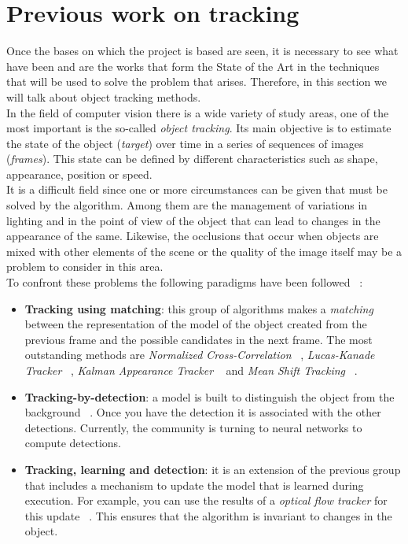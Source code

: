 \documentclass{bmvc2k}
\begin{document}
\section{Previous work on tracking}
Once the bases on which the project is based are seen, it is necessary to see what have been and are the works that form the State of the Art in the techniques that will be used to solve the problem that arises. Therefore, in this section we will talk about object tracking methods.\\ %
In the field of computer vision there is a wide variety of study areas, one of the most important is the so-called \textit{object tracking}. Its main objective is to estimate the state of the object (\textit{target}) over time in a series of sequences of images (\textit{frames}). This state can be defined by different characteristics such as shape, appearance, position or speed.\\
It is a difficult field since one or more circumstances can be given that must be solved by the algorithm. Among them are the management of variations in lighting and in the point of view of the object that can lead to changes in the appearance of the same. Likewise, the occlusions that occur when objects are mixed with other elements of the scene or the quality of the image itself may be a problem to consider in this area.\\
To confront these problems the following paradigms have been followed ~\cite{smeulders2014visual}:
\begin{itemize}
\item \textbf{Tracking using matching}: this group of algorithms makes a \textit {matching} between the representation of the model of the object created from the previous frame and the possible candidates in the next frame. The most outstanding methods are \textit{Normalized Cross-Correlation} ~\cite{briechle2001template}, \textit{Lucas-Kanade Tracker} ~\cite {baker2004lucas}, \textit{Kalman Appearance Tracker} ~\cite{nguyen2004fast} and \textit{Mean Shift Tracking} ~\cite{comaniciu2000real}.
\item \textbf{Tracking-by-detection}: a model is built to distinguish the object from the background ~\cite{nguyen2006robust}. Once you have the detection it is associated with the other detections. Currently, the community is turning to neural networks to compute detections.
\item \textbf{Tracking, learning and detection}: it is an extension of the previous group that includes a mechanism to update the model that is learned during execution. For example, you can use the results of a \textit{optical flow tracker} for this update ~\cite{kalal2010pn}. This ensures that the algorithm is invariant to changes in the object. 
\end{itemize}
\end{document}
